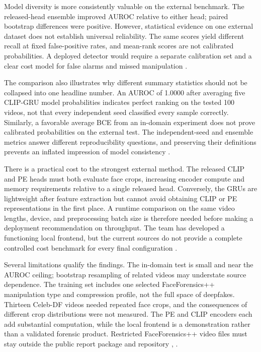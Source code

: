 \documentclass[conference,10pt]{IEEEtran}
\begin{document}
Model diversity is more consistently valuable on the external benchmark. The released-head ensemble improved AUROC relative to either head; paired bootstrap differences were positive. However, statistical evidence on one external dataset does not establish universal reliability. The same scores yield different recall at fixed false-positive rates, and mean-rank scores are not calibrated probabilities. A deployed detector would require a separate calibration set and a clear cost model for false alarms and missed manipulation \cite{capstone2026}.

The comparison also illustrates why different summary statistics should not be collapsed into one headline number. An AUROC of 1.0000 after averaging five CLIP-GRU model probabilities indicates perfect ranking on the tested 100 videos, not that every independent seed classified every sample correctly. Similarly, a favorable average BCE from an in-domain experiment does not prove calibrated probabilities on the external test. The independent-seed and ensemble metrics answer different reproducibility questions, and preserving their definitions prevents an inflated impression of model consistency \cite{capstone2026}.

There is a practical cost to the strongest external method. The released CLIP and PE heads must both evaluate face crops, increasing encoder compute and memory requirements relative to a single released head. Conversely, the GRUs are lightweight after feature extraction but cannot avoid obtaining CLIP or PE representations in the first place. A runtime comparison on the same video lengths, device, and preprocessing batch size is therefore needed before making a deployment recommendation on throughput. The team has developed a functioning local frontend, but the current sources do not provide a complete controlled cost benchmark for every final configuration \cite{capstone2026}.

Several limitations qualify the findings. The in-domain test is small and near the AUROC ceiling; bootstrap resampling of related videos may understate source dependence. The training set includes one selected FaceForensics++ manipulation type and compression profile, not the full space of deepfakes. Thirteen Celeb-DF videos needed repeated face crops, and the consequences of different crop distributions were not measured. The PE and CLIP encoders each add substantial computation, while the local frontend is a demonstration rather than a validated forensic product. Restricted FaceForensics++ video files must stay outside the public report package and repository \cite{rossler2019}, \cite{capstone2026}.
\end{document}
